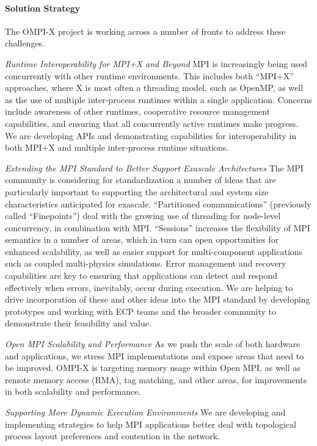 \paragraph{Solution Strategy}
The OMPI-X project is working across a number of fronts to address
these challenges.

\emph{Runtime Interoperability for MPI+X and Beyond} MPI is
increasingly being used concurrently with other runtime environments.
This includes both ``MPI+X'' approaches, where X
is most often a threading model, such as OpenMP, as
well as the use of multiple inter-process runtimes within a single
application.  Concerns include awareness of other runtimes,
cooperative resource management capabilities, and ensuring that all
concurrently active runtimes make progress.  We are developing APIs and
demonstrating capabilities for interoperability in both MPI+X and
multiple inter-process runtime situations.

\emph{Extending the MPI Standard to Better Support Exascale
Architectures} The MPI community is considering for standardization a
number of ideas that 
are particularly important to supporting
the architectural and system size characteristics anticipated for
exascale.  ``Partitioned communications'' (previously called ``Finepoints'')
deal with the growing use of threading for node-level concurrency, in
combination with MPI.  ``Sessions'' increases the flexibility of MPI
semantics in a number of areas, which in turn can open opportunities
for enhanced scalability, as well as easier support for
multi-component applications such as coupled multi-physics
simulations. Error management and recovery capabilities are key to
ensuring that applications can detect and respond effectively when errors, 
inevitably, occur during execution.  We are helping to drive incorporation
of these and other ideas into the MPI standard by developing prototypes and 
working with ECP teams and the broader community to demonstrate their 
feasibility and value.

\emph{Open MPI Scalability and Performance} As we push the scale of
both hardware and applications, we stress MPI implementations and
expose areas that need to be improved.
OMPI-X is targeting memory usage within Open MPI, as well as remote
memory access (RMA), tag matching, and other areas, for improvements
in both scalability and performance.

\emph{Supporting More Dynamic Execution Environments} We are
developing and implementing strategies to help MPI applications
better deal with topological process layout preferences
and contention in the network.

